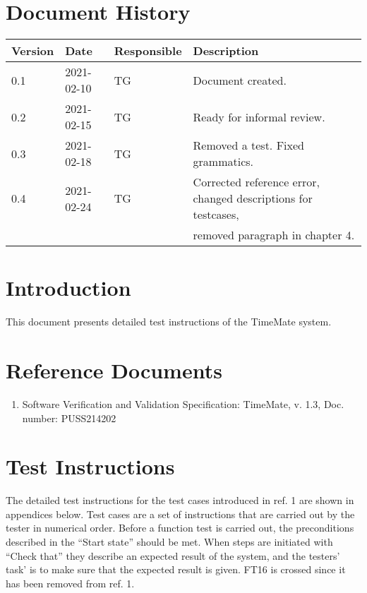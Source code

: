 \documentclass{article}
\date {#1}
\title {
    \documentNumber {03}    
    
    \documentVersion {0.4}
    
    \documentTitle {Software Verification and Validation Instructions}
    \documentGroup {2}
 
    \documentResponsible {Test Group}
    \documentAuthors {Test Group}
    
    \documentDate {2021-02-25}
}
\begin{document}
\maketitle
\thispagestyle{empty}

\newpage

\tableofcontents

\newpage


\section{Document History}
\begin{tabular}{ l | l | l | l }
    Version & Date & Responsible & Description \\
    \hline
   0.1 & 2021-02-10 & TG & Document created. \\
   0.2 & 2021-02-15 & TG & Ready for informal review. \\
    0.3 & 2021-02-18 & TG & Removed a test. Fixed grammatics. \\
    0.4 & 2021-02-24 & TG & Corrected reference error, changed descriptions for testcases,  \\
         &            &   &   removed paragraph in chapter 4. \\
\end{tabular}

\section{Introduction}
This document presents detailed test instructions of the  TimeMate system.

\section{Reference Documents}
\begin{enumerate}
	\item Software Verification and Validation Specification: 	TimeMate, v. 1.3, Doc. number: PUSS214202
\end{enumerate}

\section{Test Instructions}
The detailed test instructions for the test cases introduced in ref. 1 are shown in appendices below. Test cases are a set of instructions that are carried out by the tester in numerical order. Before a function test is carried out, the preconditions described in the “Start state” should be met. When steps are initiated with “Check that” they describe an expected result of the system, and the testers' task' is to make sure that the expected result is given. FT16 is crossed since it has been removed from ref. 1.
\end{document}
